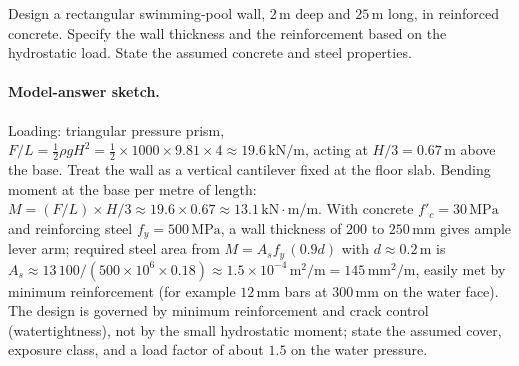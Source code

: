\begin{exercise}
Design a rectangular swimming-pool wall, $2\,\si{\meter}$ deep
and $25\,\si{\meter}$ long, in reinforced concrete. Specify the
wall thickness and the reinforcement based on the hydrostatic
load. State the assumed concrete and steel properties.

\paragraph{Model-answer sketch.} Loading: triangular pressure prism,
$F/L = \tfrac12\rho g H^2 = \tfrac12 \times 1000 \times 9.81 \times 4
\approx 19.6\,\text{kN/m}$, acting at $H/3 = 0.67\,\si{\meter}$ above the
base. Treat the wall as a vertical cantilever fixed at the floor slab.
Bending moment at the base per metre of length: $M = (F/L) \times H/3
\approx 19.6 \times 0.67 \approx 13.1\,\text{kN}\cdot\text{m/m}$. With
concrete $f'_c = 30\,\text{MPa}$ and reinforcing steel $f_y =
500\,\text{MPa}$, a wall thickness of $200\text{ to }250\,\si{
\milli\meter}$ gives ample lever arm; required steel area from
$M = A_s f_y\, (0.9d)$ with $d \approx 0.2\,\si{\meter}$ is
$A_s \approx 13\,100/(500\times10^6 \times 0.18) \approx 1.5 \times
10^{-4}\,\text{m}^2/\text{m} = 145\,\text{mm}^2/\text{m}$, easily met by
minimum reinforcement (for example $12\,\si{\milli\meter}$ bars at
$300\,\si{\milli\meter}$ on the water face). The design is governed by
minimum reinforcement and crack control (watertightness), not by the
small hydrostatic moment; state the assumed cover, exposure class, and a
load factor of about $1.5$ on the water pressure.
\end{exercise}

